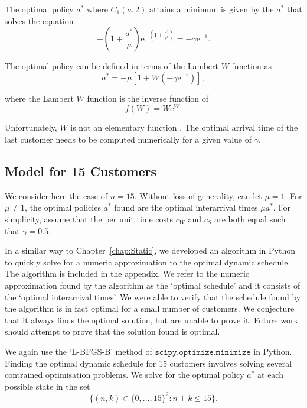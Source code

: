 The optimal policy $a^{*}$ where $C_{1} (a, 2)$ attains a minimum is given by the $a^{*}$ that solves the equation
\begin{equation}
	- \left( 1 + \frac{a^{*}}{\mu} \right) \mathrm{e}^{- \left( 1 + \frac{a^{*}}{\mu} \right)} = - \gamma \mathrm{e}^{-1}.
\end{equation}

The optimal policy can be defined in terms of the Lambert $W$ function as
\begin{equation}
	a^{*} = - \mu \left[ 1 + W \left( - \gamma \mathrm{e}^{-1} \right) \right],
\end{equation}

where the Lambert $W$ function is the inverse function of
\begin{equation}
	f (W) = W \mathrm{e}^{W}.
\end{equation}

Unfortunately, $W$ is not an elementary function \citep{Chow}. The optimal arrival time of the last customer needs to be computed numerically for a given value of $\gamma$.

\subsection{Model for 15 Customers}
We consider here the case of $n = 15$. Without loss of generality, can let $\mu = 1$. For $\mu \neq 1$, the optimal policies $a^{*}$ found are the optimal interarrival times $\mu a^{*}$. For simplicity, assume that the per unit time costs $c_{W}$ and $c_{S}$ are both equal such that $\gamma = 0.5$.

In a similar way to Chapter~\ref{chap:Static}, we developed an algorithm in Python to quickly solve for a numeric approximation to the optimal dynamic schedule. The algorithm is included in the appendix. We refer to the numeric approximation found by the algorithm as the `optimal schedule' and it consists of the `optimal interarrival times'. We were able to verify that the schedule found by the algorithm is in fact optimal for a small number of customers. We conjecture that it always finds the optimal solution, but are unable to prove it. Future work should attempt to prove that the solution found is optimal.

We again use the `L-BFGS-B' method of $\texttt{scipy.optimize.minimize}$ in Python. Finding the optimal dynamic schedule for 15 customers involves solving several contrained optimisation problems. We solve for the optimal policy $a^{*}$ at each possible state in the set
\begin{equation}
	\Big\{ (n, k) \in \{ 0, \ldots, 15 \}^{2} : n + k \leq 15 \Big\}.
\end{equation}

